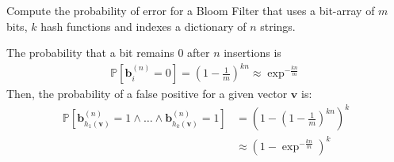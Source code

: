 \exercise

Compute the probability of error for a Bloom Filter that uses a bit-array of $m$
bits, $k$ hash functions and indexes a dictionary of $n$ strings.

\solution

The probability that a bit remains 0 after $n$ insertions is
%
\begin{align*}
  \mathbb{P}[\mathbf{b}_i^{(n)} = 0] = \left( 1 - \frac{1}{m} \right)^{kn}
  \approx \exp^{-\frac{kn}{m}}
\end{align*}
%
Then, the probability of a false positive for a given vector $\mathbf{v}$ is:
%
\begin{align*}
  \mathbb{P}[\mathbf{b}_{h_1(\mathbf{v})}^{(n)} = 1 \wedge \dots \wedge
  \mathbf{b}_{h_k(\mathbf{v})}^{(n)} = 1] &= \left(1 - \left( 1 - \frac{1}{m}
  \right)^{kn} \right)^k \\ &\approx \left(1 - \exp^{-\frac{kn}{m}} \right)^k
\end{align*}
